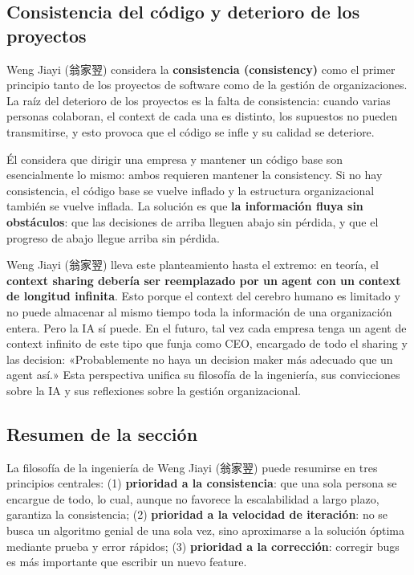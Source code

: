 \subsection{Consistencia del código y deterioro de los proyectos}

Weng Jiayi (翁家翌) considera la \textbf{consistencia (consistency)} como el primer principio tanto de los proyectos de software como de la gestión de organizaciones. La raíz del deterioro de los proyectos es la falta de consistencia: cuando varias personas colaboran, el context de cada una es distinto, los supuestos no pueden transmitirse, y esto provoca que el código se infle y su calidad se deteriore.

Él considera que dirigir una empresa y mantener un código base son esencialmente lo mismo: ambos requieren mantener la consistency. Si no hay consistencia, el código base se vuelve inflado y la estructura organizacional también se vuelve inflada. La solución es que \textbf{la información fluya sin obstáculos}: que las decisiones de arriba lleguen abajo sin pérdida, y que el progreso de abajo llegue arriba sin pérdida.

Weng Jiayi (翁家翌) lleva este planteamiento hasta el extremo: en teoría, el \textbf{context sharing debería ser reemplazado por un agent con un context de longitud infinita}. Esto porque el context del cerebro humano es limitado y no puede almacenar al mismo tiempo toda la información de una organización entera. Pero la IA sí puede. En el futuro, tal vez cada empresa tenga un agent de context infinito de este tipo que funja como CEO, encargado de todo el sharing y las decision: «Probablemente no haya un decision maker más adecuado que un agent así.» Esta perspectiva unifica su filosofía de la ingeniería, sus convicciones sobre la IA y sus reflexiones sobre la gestión organizacional.

\subsection{Resumen de la sección}

La filosofía de la ingeniería de Weng Jiayi (翁家翌) puede resumirse en tres principios centrales: (1) \textbf{prioridad a la consistencia}: que una sola persona se encargue de todo, lo cual, aunque no favorece la escalabilidad a largo plazo, garantiza la consistencia; (2) \textbf{prioridad a la velocidad de iteración}: no se busca un algoritmo genial de una sola vez, sino aproximarse a la solución óptima mediante prueba y error rápidos; (3) \textbf{prioridad a la corrección}: corregir bugs es más importante que escribir un nuevo feature.


